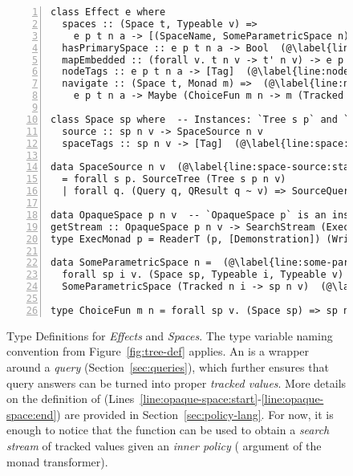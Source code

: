 \begin{figure}[t]
\begin{lncodebox}
\begin{lstlisting}[style=haskell,numbers=left,numbersep=12pt]
class Effect e where
  spaces :: (Space t, Typeable v) =>
    e p t n a -> [(SpaceName, SomeParametricSpace n)]   (@\label{line:spaces}@)
  hasPrimarySpace :: e p t n a -> Bool  (@\label{line:has-primary-space}@)
  mapEmbedded :: (forall v. t n v -> t' n v) -> e p t n a -> e p t' n a
  nodeTags :: e p t n a -> [Tag]  (@\label{line:node-tags}@)
  navigate :: (Space t, Monad m) =>  (@\label{line:navigate:start}@)
    e p t n a -> Maybe (ChoiceFun m n -> m (Tracked n a))   (@\label{line:navigate:end}@)

class Space sp where  -- Instances: `Tree s p` and `OpaqueSpace p` (@\label{line:space:start}@)  (@\label{line:space:end}@)
  source :: sp n v -> SpaceSource n v
  spaceTags :: sp n v -> [Tag]  (@\label{line:space:end}@) (@\label{line:space-tags}@)

data SpaceSource n v  (@\label{line:space-source:start}@)
  = forall s p. SourceTree (Tree s p n v)
  | forall q. (Query q, QResult q ~ v) => SourceQuery (AttachedQuery n q)  (@\label{line:space-source:end}@)

data OpaqueSpace p n v  -- `OpaqueSpace p` is an instance of `Space`   (@\label{line:opaque-space:start}@)
getStream :: OpaqueSpace p n v -> SearchStream (ExecMonad p) (Tracked n v)
type ExecMonad p = ReaderT (p, [Demonstration]) (WriterT Trace IO)  (@\label{line:opaque-space:end}@)

data SomeParametricSpace n =  (@\label{line:some-parametric-space:start}@)
  forall sp i v. (Space sp, Typeable i, Typeable v) =>
  SomeParametricSpace (Tracked n i -> sp n v)  (@\label{line:some-parametric-space:end}@)

type ChoiceFun m n = forall sp v. (Space sp) => sp n v -> m (Tracked n v)   (@\label{line:choice-fun}@)
\end{lstlisting}
\end{lncodebox}
\vspace{-0.2cm}
\caption{Type Definitions for \emph{Effects} and \emph{Spaces}. The type variable naming convention from Figure~\ref{fig:tree-def} applies. An  is a wrapper around a \emph{query} (Section~\ref{sec:queries}), which further ensures that query answers can be turned into proper \emph{tracked values}. More details on the definition of  (Lines~\ref{line:opaque-space:start}-\ref{line:opaque-space:end}) are provided in Section~\ref{sec:policy-lang}. For now, it is enough to notice that the  function can be used to obtain a \emph{search stream} of tracked values given an \emph{inner policy} ( argument of the  monad transformer).}\label{fig:eff-space-def}
\end{figure}
